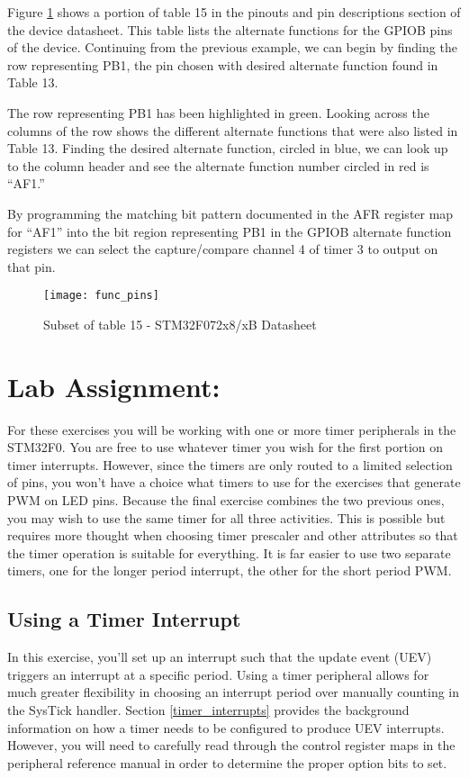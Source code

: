 \documentclass[11pt,fleqn]{book} %
\begin{document}
   	
    \begin{example} 
Figure \ref{func_pins} shows a portion of table 15 in the pinouts and pin descriptions section of the device datasheet. This table lists the alternate functions for the GPIOB pins of the device. Continuing from the previous example, we can begin by finding the row representing PB1, the pin chosen with desired alternate function found in Table 13. 

The row representing PB1 has been highlighted in green. Looking across the columns of the row shows the different alternate functions that were also listed in Table 13. Finding the desired alternate function, circled in blue, we can look up to the column header and see the alternate function number circled in red is ``AF1.'' 

By programming the matching bit pattern documented in the AFR register map for ``AF1'' into the bit region representing PB1 in the GPIOB alternate function registers we can select the capture/compare channel 4 of timer 3 to output on that pin.  
    \end{example}

    \begin{figure}[]
    \centering\texttt{[image: func\_pins]}
    \caption{Subset of table 15 - STM32F072x8/xB Datasheet}
    \label{func_pins}
\end{figure}
    
\section{Lab Assignment:}
For these exercises you will be working with one or more timer peripherals in the STM32F0. You are free to use whatever timer you wish for the first portion on timer interrupts. However, since the timers are only routed to a limited selection of pins, you won't have a choice what timers to use for the exercises that generate PWM on  LED pins.  
Because the final exercise combines the two previous ones, you may wish to use the same timer for all three activities. This is possible but requires more thought when choosing timer prescaler and other attributes so that the timer operation is suitable for everything. It is far easier to use two separate timers, one for the longer period interrupt, the other for the short period PWM. 

\subsection{Using a Timer Interrupt}
In this exercise, you'll set up an interrupt such that the update event (UEV) triggers an interrupt at a specific period. Using a timer peripheral allows for much greater flexibility in choosing an interrupt period over manually counting in the SysTick handler. Section \ref{timer_interrupts} provides the background information on how a timer needs to be configured to produce UEV interrupts. However, you will need to carefully read through the control register maps in the peripheral reference manual in order to determine the proper option bits to set. 
\end{document}
